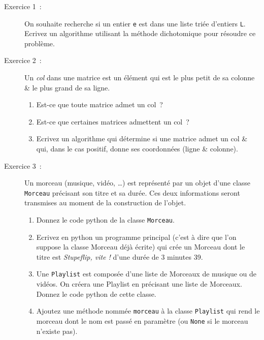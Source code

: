 \documentclass
[12pt]
{article}
\begin{document}
\begin{description}
\item[Exercice 1~:] On souhaite recherche si un entier \texttt{e} est dans une liste triée d'entiers \texttt{L}. Ecrivez un algorithme utilisant la méthode dichotomique pour résoudre ce problème. \\


%
\item[Exercice 2~:] Un {\it col} dans une matrice est un élément qui est le plus petit de sa colonne \& le plus grand de sa ligne.
\begin{enumerate}
\item Est-ce que toute matrice admet un col~?
\item Est-ce que certaines matrices admettent un col~?
\item Ecrivez un algorithme qui détermine si une matrice admet un col \& qui, dans le cas positif, donne ses coordonnées (ligne \& colonne).\\
\end{enumerate}

%
%

\item[Exercice 3~:] Un morceau (musique, vidéo, \dots) est représenté par un objet d’une classe \texttt{Morceau} précisant son titre et sa durée. Ces deux informations seront transmises au moment de la construction de l’objet.
\begin{enumerate}
    \item  Donnez le code python de la classe \texttt{Morceau}.
    \item Ecrivez en python un programme principal (c’est à dire que l’on suppose la classe Morceau déjà écrite) qui crée un Morceau dont le titre est {\it Stupeflip, vite !} d’une durée de 3 minutes 39.
    \item Une \texttt{Playlist} est composée d’une liste de Morceaux de musique ou de vidéos. On créera une
Playlist en précisant une liste de Morceaux. Donnez le code python de cette classe.
    \item Ajoutez une méthode nommée \texttt{morceau} à la classe \texttt{Playlist} qui rend le morceau dont le nom est passé en paramètre (ou \texttt{None} si le morceau n'existe pas).
\end{enumerate}


\end{description}
\end{document}
